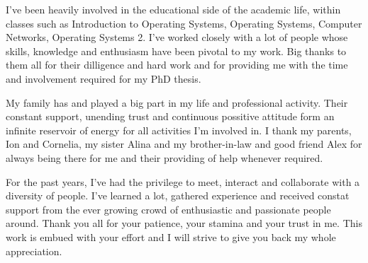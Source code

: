 I've been heavily involved in the educational side of the academic life,
within classes such as Introduction to Operating Systems, Operating Systems,
Computer Networks, Operating Systems 2. I've worked closely with a lot of
people whose skills, knowledge and enthusiasm have been pivotal to my work.
Big thanks to them all for their dilligence and hard work and for providing me
with the time and involvement required for my PhD thesis.

My family has and played a big part in my life and professional activity.
Their constant support, unending trust and continuous possitive attitude form
an infinite reservoir of energy for all activities I'm involved in. I thank my
parents, Ion and Cornelia, my sister Alina and my brother-in-law and good
friend Alex for always being there for me and their providing of help whenever
required.

For the past years, I've had the privilege to meet, interact and collaborate
with a diversity of people. I've learned a lot, gathered experience and
received constat support from the ever growing crowd of enthusiastic and
passionate people around. Thank you all for your patience, your stamina and
your trust in me. This work is embued with your effort and I will strive to
give you back my whole appreciation.
